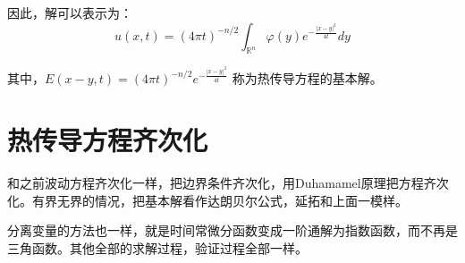\documentclass[12pt,a4paper]{article}
\numberwithin{subsection}{section}   %
\numberwithin{subsubsection}{subsection}
\theoremstyle{plain}
\theoremstyle{definition}
\theoremstyle{remark}
\theoremstyle{remark}
\begin{document}
	
	
	
	因此，解可以表示为：
	\begin{equation}
		u(x, t) = (4\pi t)^{-n/2} \int_{\mathbb{R}^n} \varphi(y) e^{-\frac{|x - y|^2}{4t}} dy
	\end{equation}
	
	其中，\( E(x - y, t) = (4\pi t)^{-n/2} e^{-\frac{|x - y|^2}{4t}} \) 称为热传导方程的基本解。
	
	
		\newpage
	\section{热传导方程齐次化}
	和之前波动方程齐次化一样，把边界条件齐次化，用Duhamamel原理把方程齐次化。有界无界的情况，把基本解看作达朗贝尔公式，延拓和上面一模样。
	
	分离变量的方法也一样，就是时间常微分函数变成一阶通解为指数函数，而不再是三角函数。其他全部的求解过程，验证过程全部一样。
	
	
	
	
	
	
	
\end{document}
